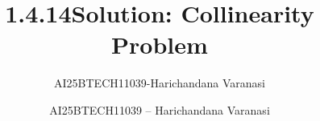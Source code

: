 \documentclass[journal]{IEEEtran}
\begin{document}

\vspace{3cm}

\title{1.4.14}
\author{AI25BTECH11039-Harichandana Varanasi}
 \maketitle
{\let\newpage\relax\maketitle}

\renewcommand{\thefigure}{\theenumi}
\renewcommand{\thetable}{\theenumi}
\setlength{\intextsep}{10pt} %


\renewcommand{\thetable}{\theenumi}


\title{Solution: Collinearity Problem}
\author{AI25BTECH11039 -- Harichandana Varanasi}
\date{}
\end{document}
